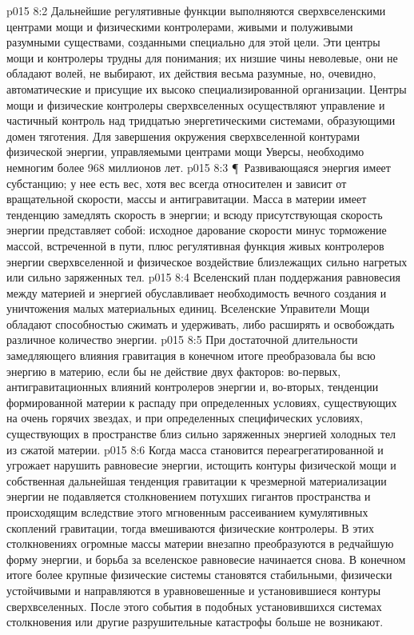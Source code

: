 \vs p015 8:2 Дальнейшие регулятивные функции выполняются сверхвселенскими центрами мощи и физическими контролерами, живыми и полуживыми разумными существами, созданными специально для этой цели. Эти центры мощи и контролеры трудны для понимания; их низшие чины неволевые, они не обладают волей, не выбирают, их действия весьма разумные, но, очевидно, автоматические и присущие их высоко специализированной организации. Центры мощи и физические контролеры сверхвселенных осуществляют управление и частичный контроль над тридцатью энергетическими системами, образующими домен тяготения. Для завершения окружения сверхвселенной контурами физической энергии, управляемыми центрами мощи Уверсы, необходимо немногим более 968 миллионов лет.
\vs p015 8:3 \P\ Развивающаяся энергия имеет субстанцию; у нее есть вес, хотя вес всегда относителен и зависит от вращательной скорости, массы и антигравитации. Масса в материи имеет тенденцию замедлять скорость в энергии; и всюду присутствующая скорость энергии представляет собой: исходное дарование скорости минус торможение массой, встреченной в пути, плюс регулятивная функция живых контролеров энергии сверхвселенной и физическое воздействие близлежащих сильно нагретых или сильно заряженных тел.
\vs p015 8:4 Вселенский план поддержания равновесия между материей и энергией обуславливает необходимость вечного создания и уничтожения малых материальных единиц. Вселенские Управители Мощи обладают способностью сжимать и удерживать, либо расширять и освобождать различное количество энергии.
\vs p015 8:5 При достаточной длительности замедляющего влияния гравитация в конечном итоге преобразовала бы всю энергию в материю, если бы не действие двух факторов: во\hyp{}первых, антигравитационных влияний контролеров энергии и, во\hyp{}вторых, тенденции формированной материи к распаду при определенных условиях, существующих на очень горячих звездах, и при определенных специфических условиях, существующих в пространстве близ сильно заряженных энергией холодных тел из сжатой материи.
\vs p015 8:6 Когда масса становится переагрегатированной и угрожает нарушить равновесие энергии, истощить контуры физической мощи и собственная дальнейшая тенденция гравитации к чрезмерной материализации энергии не подавляется столкновением потухших гигантов пространства и происходящим вследствие этого мгновенным рассеиванием кумулятивных скоплений гравитации, тогда вмешиваются физические контролеры. В этих столкновениях огромные массы материи внезапно преобразуются в редчайшую форму энергии, и борьба за вселенское равновесие начинается снова. В конечном итоге более крупные физические системы становятся стабильными, физически устойчивыми и направляются в уравновешенные и установившиеся контуры сверхвселенных. После этого события в подобных установившихся системах столкновения или другие разрушительные катастрофы больше не возникают.
